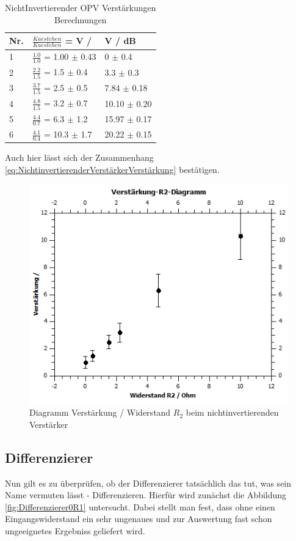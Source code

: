 \documentclass[12pt,a4paper,twoside]{article}
\begin{document}
\begin{table}[H]
    \centering
    \caption{NichtInvertierender OPV Verstärkungen Berechnungen}
    \label{tab:NioVerstärkungenBerechnet}
    \begin{tabular}{| l | l | l |}
        \hline
        Nr. & $\frac{Kaestchen}{Kaestchen}$ = V / & V / dB \\
        \hline
        1 & $\frac{1.0}{1.0}$ =  1.00 $\pm$ 0.43 & 0    $\pm$ 0.4 \\
        2 & $\frac{2.2}{1.5}$ =  1.5 $\pm$ 0.4 & 3.3 $\pm$ 0.3 \\
        3 & $\frac{3.7}{1.5}$ =  2.5 $\pm$ 0.5 & 7.84 $\pm$ 0.18 \\
        4 & $\frac{4.8}{1.5}$ =  3.2 $\pm$ 0.7 & 10.10 $\pm$ 0.20 \\
        5 & $\frac{4.4}{0.7}$ =  6.3 $\pm$ 1.2 & 15.97 $\pm$ 0.17 \\
        6 & $\frac{4.1}{0.4}$ = 10.3 $\pm$ 1.7 & 20.22 $\pm$ 0.15 \\
        \hline
    \end{tabular}
\end{table}

\noindent
Auch hier lässt sich der Zusammenhang \ref{eq:NichtinvertierenderVerstärkerVerstärkung} bestätigen.

\begin{figure}[H]
    \centering
    \includegraphics[width=0.5\linewidth]{nudes/NivVerstärkungR2Diagramm.jpg}
    \caption{Diagramm Verstärkung / Widerstand $R_{2}$ beim nichtinvertierenden Verstärker}
    \label{fig:Verstärkung/R2NIV}
\end{figure}


\subsection{Differenzierer}

Nun gilt es zu überprüfen, ob der Differenzierer tatsächlich das tut, was sein Name vermuten lässt - Differenzieren. Hierfür wird zunächst die Abbildung \ref{fig:Differenzierer0R1} untersucht.
Dabei stellt man fest, dass ohne einen Eingangswiderstand ein sehr ungenaues und zur Auswertung fast schon ungeeignetes Ergebniss geliefert wird. \newline
\end{document}
